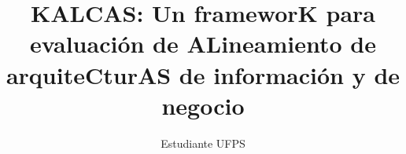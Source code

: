 \documentclass{../class/gatech-thesis-tphmAddaptation}
\title{KALCAS: Un frameworK para evaluaci\'on de ALineamiento de arquiteCturAS de informaci\'on y de negocio}
\author{Estudiante UFPS}
\begin{document}

%

\begin{preliminary}



% 

\contents
%
\end{preliminary}




%
%
%
%
%
%
%


\begin{postliminary}
\end{postliminary}

%
%
%
%


\end{document}
